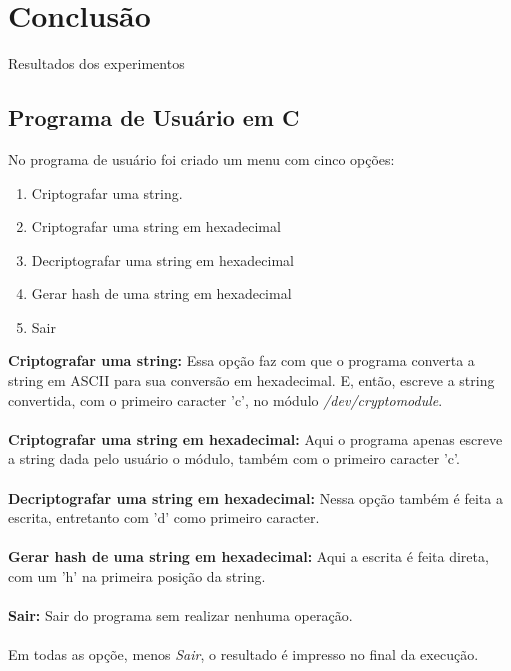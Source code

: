 \section{Conclusão}
Resultados dos experimentos
\subsection{Programa de Usuário em C}
No programa de usuário foi criado um menu com cinco opções:
\begin{enumerate}
    \item Criptografar uma string.
    \item Criptografar uma string em hexadecimal
    \item Decriptografar uma string em hexadecimal
    \item Gerar hash de uma string em hexadecimal
    \item Sair
\end{enumerate}
\textbf{Criptografar uma string:}
Essa opção faz com que o programa converta a string em ASCII para sua conversão em hexadecimal.
E, então, escreve a string convertida, com o primeiro caracter 'c', no módulo \emph{/dev/cryptomodule}.
\\
\\
\textbf{Criptografar uma string em hexadecimal:}
Aqui o programa apenas escreve a string dada pelo usuário o módulo, também com o primeiro caracter 'c'.
\\
\\
\textbf{Decriptografar uma string em hexadecimal:}
Nessa opção também é feita a escrita, entretanto com 'd' como primeiro caracter.
\\
\\
\textbf{Gerar hash de uma string em hexadecimal:}
Aqui a escrita é feita direta, com um 'h' na primeira posição da string.
\\
\\
\textbf{Sair:}
Sair do programa sem realizar nenhuma operação.
\\
\\
Em todas as opçõe, menos \emph{Sair}, o resultado é impresso no final da execução.

